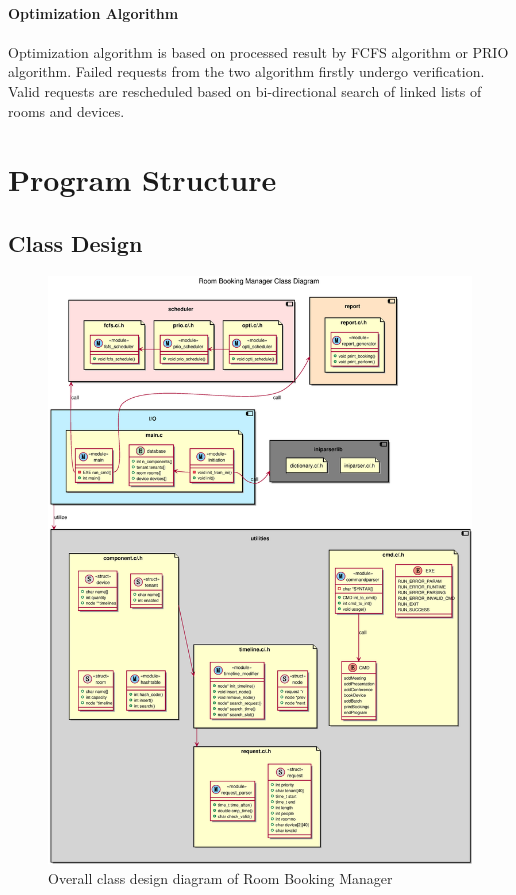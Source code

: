 \documentclass{article}
\begin{document}
        \paragraph{Optimization Algorithm}
        \paragraph{}
            Optimization algorithm is based on processed result by FCFS algorithm or
            PRIO algorithm. Failed requests from the two algorithm firstly undergo
            verification. Valid requests are rescheduled based on bi-directional
            search of linked lists of rooms and devices. 

    \cleardoublepage

    \section{Program Structure}
        \subsection{Class Design}
            \begin{figure}[!htbp]
                \centering
                \includegraphics[scale=0.4]{../res/eps/class_diagram.eps}
                \caption{Overall class design diagram of Room Booking Manager}
            \end{figure}
\end{document}
